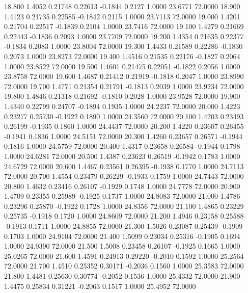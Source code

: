   18.800   1.4052   0.21748   0.22613  -0.1844   0.2127   1.0000  23.6771  72.0000
  18.900   1.4123   0.21735   0.22585  -0.1842   0.2115   1.0000  23.7113  72.0000
  19.000   1.4201   0.21704   0.22517  -0.1839   0.2104   1.0000  23.7416  72.0000
  19.100   1.4279   0.21669   0.22443  -0.1836   0.2093   1.0000  23.7709  72.0000
  19.200   1.4354   0.21635   0.22377  -0.1834   0.2083   1.0000  23.8004  72.0000
  19.300   1.4433   0.21589   0.22286  -0.1830   0.2073   1.0000  23.8273  72.0000
  19.400   1.4516   0.21535   0.22176  -0.1827   0.2064   1.0000  23.8522  72.0000
  19.500   1.4601   0.21475   0.22051  -0.1822   0.2056   1.0000  23.8758  72.0000
  19.600   1.4687   0.21412   0.21919  -0.1818   0.2047   1.0000  23.8990  72.0000
  19.700   1.4771   0.21354   0.21791  -0.1813   0.2039   1.0000  23.9234  72.0000
  19.800   1.4846   0.21318   0.21692  -0.1810   0.2028   1.0000  23.9528  72.0000
  19.900   1.4340   0.22799   0.24707  -0.1894   0.1935   1.0000  24.2237  72.0000
  20.000   1.4223   0.23277   0.25730  -0.1922   0.1890   1.0000  24.3560  72.0000
  20.100   1.4203   0.23493   0.26199  -0.1935   0.1860   1.0000  24.4437  72.0000
  20.200   1.4220   0.23607   0.26455  -0.1941   0.1836   1.0000  24.5151  72.0000
  20.300   1.4260   0.23657   0.26571  -0.1944   0.1816   1.0000  24.5759  72.0000
  20.400   1.4317   0.23658   0.26584  -0.1944   0.1798   1.0000  24.6281  72.0000
  20.500   1.4387   0.23623   0.26519  -0.1942   0.1783   1.0000  24.6729  72.0000
  20.600   1.4467   0.23561   0.26395  -0.1938   0.1770   1.0000  24.7113  72.0000
  20.700   1.4554   0.23479   0.26229  -0.1933   0.1759   1.0000  24.7443  72.0000
  20.800   1.4632   0.23416   0.26107  -0.1929   0.1748   1.0000  24.7778  72.0000
  20.900   1.4709   0.23355   0.25989  -0.1925   0.1737   1.0000  24.8083  72.0000
  21.000   1.4786   0.23296   0.25870  -0.1922   0.1728   1.0000  24.8356  72.0000
  21.100   1.4865   0.23229   0.25735  -0.1918   0.1720   1.0000  24.8609  72.0000
  21.200   1.4946   0.23158   0.25588  -0.1913   0.1711   1.0000  24.8855  72.0000
  21.300   1.5026   0.23087   0.25439  -0.1909   0.1703   1.0000  24.9104  72.0000
  21.400   1.5099   0.23034   0.25316  -0.1905   0.1694   1.0000  24.9390  72.0000
  21.500   1.5008   0.23458   0.26107  -0.1925   0.1665   1.0000  25.0265  72.0000
  21.600   1.4591   0.24913   0.29220  -0.2010   0.1592   1.0000  25.2564  72.0000
  21.700   1.4510   0.25352   0.30171  -0.2036   0.1560   1.0000  25.3583  72.0000
  21.800   1.4481   0.25630   0.30774  -0.2052   0.1536   1.0000  25.4332  72.0000
  21.900   1.4475   0.25834   0.31221  -0.2063   0.1517   1.0000  25.4952  72.0000
